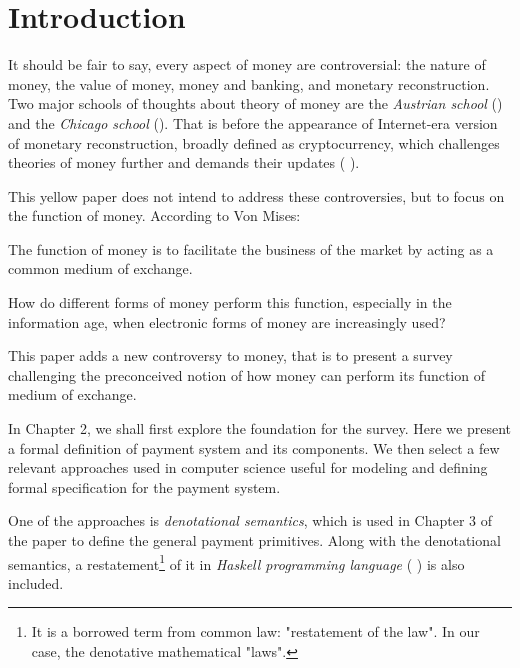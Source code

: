 \chapter{Introduction}

It should be fair to say, every aspect of money are controversial: the nature of money, the value of money, money and
banking, and monetary reconstruction. Two major schools of thoughts about theory of money are the \textit{Austrian
    school} (\cite{von2013theory}) and the \textit{Chicago school} (\cite{friedman1989quantity}). That is before the
appearance of Internet-era version of monetary reconstruction, broadly defined as cryptocurrency, which challenges
theories of money further and demands their updates (\cite{ammous2018can} \cite{hardle2020understanding}).

This yellow paper does not intend to address these controversies, but to focus on the function of money. According to
Von Mises:

\begin{displayquote}
The function of money is to facilitate the business of the market by acting as a common medium of
exchange. 
\end{displayquote}

How do different forms of money perform this function, especially in the information age, when electronic forms of money
are increasingly used?

This paper adds a new controversy to money, that is to present a survey challenging the preconceived notion of how money
can perform its function of medium of exchange.

In Chapter 2, we shall first explore the foundation for the survey. Here we present a formal definition of payment
system and its components. We then select a few relevant approaches used in computer science useful for modeling and
defining formal specification for the payment system.

One of the approaches is \textit{denotational semantics}, which is used in Chapter 3 of the paper to define the general
payment primitives. Along with the denotational semantics, a restatement\footnote{It is a borrowed term from common law:
"restatement of the law". In our case, the denotative mathematical "laws".} of it in \textit{Haskell programming
    language} (\cite{hudak1992report} \cite{jones2003haskell} \cite{marlow2010haskell}) is also included.

